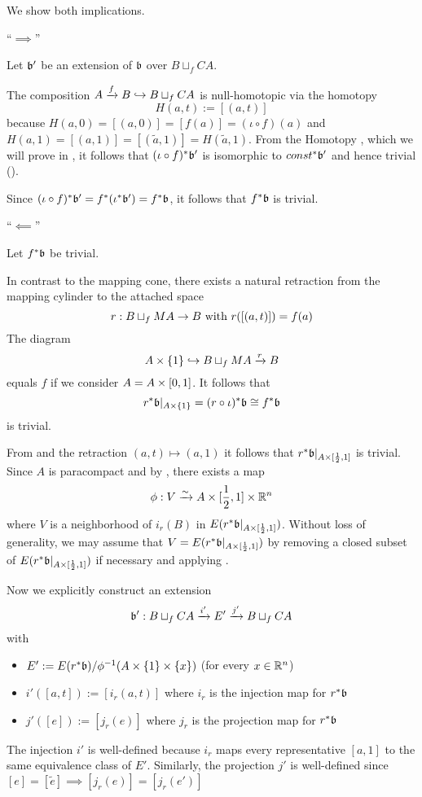 \begin{myproof}
    We show both implications.

    ``$\implies$''

    Let $\bb'$ be an extension of $\bb$ over $B \sqcup_f CA$.

    The composition $A \xto{f} B \incl B \sqcup_f CA$ is null-homotopic via the homotopy
    \[ H(a, t) := [(a, t)] \]
    because $H(a, 0) = [(a, 0)] = [f(a)] = (\iota \circ f)(a)$ and $H(a, 1) = [(a, 1)] = [(\tilde{a}, 1)] = H(\tilde{a}, 1)$.
    From the Homotopy , which we will prove in ,
    it follows that $\ind{(\iota \circ f)}\bb'$ is isomorphic to $\ind{const}\bb'$ and hence trivial ().

    Since $\ind{(\iota \circ f)}\bb' = \ind{f}(\ind{\iota}\bb') = \ind{f}\bb$, it follows that $\ind{f}\bb$ is trivial.

    ``$\impliedby$''

    Let $\ind{f}\bb$ be trivial.

    In contrast to the mapping cone, there exists a natural retraction from the mapping cylinder to the attached space
    \[ r: B \sqcup_f MA \to B \twith r([(a, t)]) = f(a) \]
    The diagram
    \[ A \times \{1\} \incl B \sqcup_f MA \xto{r} B \]
    equals $f$ if we consider $A = \cylup{A}$.
    It follows that
    \[ \ind{r}\bb\restr{A \times \{1\}} = \ind{(r \circ \iota)}\bb \cong \ind{f}\bb \]
    is trivial.

    From  and the retraction $(a, t) \mapsto (a, 1)$ it follows that $\ind{r}\bb\restr{A \times [\half, 1]}$ is trivial.
    Since $A$ is paracompact and by , there exists a map
    \[ \phi: V \isomto A \times [\half, 1] \times \R^n \]
    where $V$ is a neighborhood of $i_r(B)$ in $E(\ind{r}\bb\restr{A \times [\half, 1]})$.
    Without loss of generality, we may assume that $V = E(\ind{r}\bb\restr{A \times [\half, 1]})$
    by removing a closed subset of $E(\ind{r}\bb\restr{A \times [\half, 1]})$ if necessary and applying .

    Now we explicitly construct an extension
    \[ \bundledef{\bb'}{B \sqcup_f CA}{E'}{i'}{j'} \]
    with
    \begin{itemize}
        \item $E' := E(\ind{r}\bb) / \inv{\phi}(A \times \{1\} \times \{x\})$ (for every $x \in \R^n$)
        \item $i'([a, t]) := [i_r(a, t)]$ where $i_r$ is the injection map for $\ind{r}\bb$
        \item $j'([e]) := [j_r(e)]$ where $j_r$ is the projection map for $\ind{r}\bb$
    \end{itemize}
    The injection $i'$ is well-defined because $i_r$ maps every representative $[a, 1]$ to the same equivalence class of $E'$.
    Similarly, the projection $j'$ is well-defined since $[e] = [\tilde{e}] \implies [j_r(e)] = [j_r(e')]$


\end{myproof}
